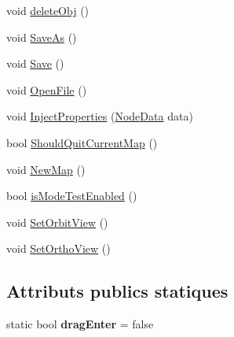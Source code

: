 \begin{DoxyCompactItemize}
\item 
void \hyperlink{class_interface_graphique_1_1_editor_controller_ad86294c955d7826b49838b849f7cedc5}{delete\-Obj} ()
\item 
void \hyperlink{class_interface_graphique_1_1_editor_controller_aee3e9f4ced30bc8aeaeba7b8456dc614}{Save\-As} ()
\item 
void \hyperlink{class_interface_graphique_1_1_editor_controller_a8db782fb69d7ea0d739305525aaf3b7b}{Save} ()
\item 
void \hyperlink{class_interface_graphique_1_1_editor_controller_a82534a07ed6435a64360a01ce659128d}{Open\-File} ()
\item 
void \hyperlink{class_interface_graphique_1_1_editor_controller_abd34937384562cfcf70df175402cba81}{Inject\-Properties} (\hyperlink{struct_interface_graphique_1_1_node_data}{Node\-Data} data)
\item 
bool \hyperlink{class_interface_graphique_1_1_editor_controller_ad98d32842dca7a2793b6b1dda99138f0}{Should\-Quit\-Current\-Map} ()
\item 
void \hyperlink{class_interface_graphique_1_1_editor_controller_ac0af486246bed86d3323d8f3ec18180e}{New\-Map} ()
\item 
bool \hyperlink{class_interface_graphique_1_1_editor_controller_acd141362ec2974ce9d780ca1834612b7}{is\-Mode\-Test\-Enabled} ()
\item 
void \hyperlink{class_interface_graphique_1_1_editor_controller_ad00d9ce5b81c2373d51e7dcddb1fcbb1}{Set\-Orbit\-View} ()
\item 
void \hyperlink{class_interface_graphique_1_1_editor_controller_a45ab0c31c438be56159dd4edd920036c}{Set\-Ortho\-View} ()
\end{DoxyCompactItemize}
\subsection*{Attributs publics statiques}
\begin{DoxyCompactItemize}
\item 
\hypertarget{class_interface_graphique_1_1_editor_controller_a82feebbd903c444d0b619af07f099a91}{static bool {\bfseries drag\-Enter} = false}\label{class_interface_graphique_1_1_editor_controller_a82feebbd903c444d0b619af07f099a91}

\end{DoxyCompactItemize}


